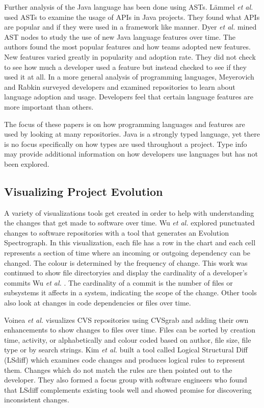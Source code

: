 Further analysis of the Java language has been done using ASTs. L\"{a}mmel \textit{et al.} \cite{Lammel:2011:LAA:1982185.1982471} used ASTs to examine the usage of APIs in Java projects. They found what APIs are popular and if they were used in a framework like manner. Dyer \textit{et al.} \cite{Dyer:2014:MBA:2568225.2568295} mined AST nodes to study the use of new Java language features over time. The authors found the most popular features and how teams adopted new features. New features varied greatly in popularity and adoption rate. They did not check to see how much a developer used a feature but instead checked to see if they used it at all. In a more general analysis of programming languages, Meyerovich and Rabkin \cite{Meyerovich:2013:EAP:2509136.2509515} surveyed developers and examined repositories to learn about language adoption and usage. Developers feel that certain language features are more important than others.

The focus of these papers is on how programming languages and features are used by looking at many repositories. Java is a strongly typed language, yet there is no focus specifically on how types are used throughout a project. Type info may provide additional information on how developers use languages but has not been explored.

\subsection{Visualizing Project Evolution}

A variety of visualizations tools get created in order to help with understanding the changes that get made to software over time. Wu \textit{et al.} \cite{wu2004a} explored punctuated changes to software repositories with a tool that generates an Evolution Spectrograph. In this visualization, each file has a row in the chart and each cell represents a section of time where an incoming or outgoing dependency can be changed. The colour is determined by the frequency of change. This work was continued to show file directoryies and display the cardinality of a developer's commits Wu \textit{et al.} \cite{wu2004}. The cardinality of a commit is the number of files or subsystems it affects in a system, indicating the scope of the change. Other tools also look at changes in code dependencies \cite{6980224} or files \cite{6650525, 7332421} over time.

Voinea \textit{et al.} \cite{voinea2006} visualizes CVS repositories using CVSgrab and adding their own enhancements to show changes to files over time. Files can be sorted by creation time, activity, or alphabetically and colour coded based on author, file size, file type or by search strings. Kim \textit{et al.} \cite{Kim:2009:DRS:1555001.1555046} built a tool called Logical Structural Diff (LSdiff) which examines code changes and produces logical rules to represent them. Changes which do not match the rules are then pointed out to the developer. They also formed a focus group with software engineers who found that LSdiff complements existing tools well and showed promise for discovering inconsistent changes.

